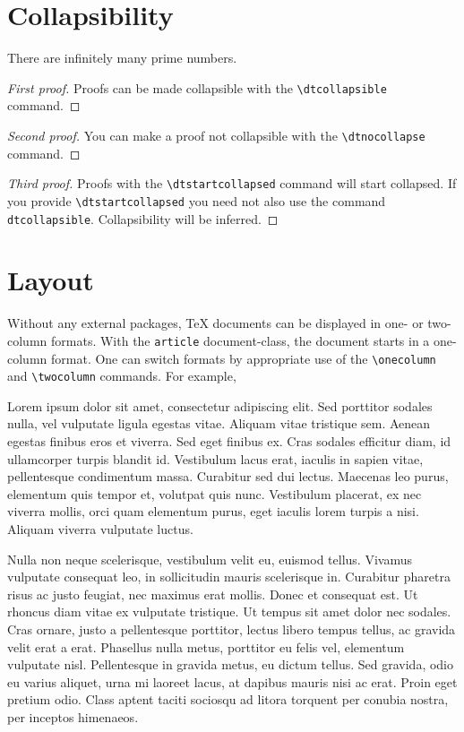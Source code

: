 \documentclass[11pt]{article}
\begin{document}
\section{Collapsibility}

\begin{theorem}
    There are infinitely many prime numbers.
\end{theorem}

\begin{proof}[First proof]\dtcollapsible
    Proofs can be made collapsible with the \verb|\dtcollapsible| command.
\end{proof}

\begin{proof}[Second proof]\dtnocollapse
    You can make a proof not collapsible with the \verb|\dtnocollapse| command.
\end{proof}

\begin{proof}[Third proof]\dtstartcollapsed
    Proofs with the \verb|\dtstartcollapsed| command will start collapsed.
    If you provide \verb|\dtstartcollapsed| you need not also use the command \verb|dtcollapsible|.
    Collapsibility will be inferred.
\end{proof}

\section{Layout}
Without any external packages, \TeX{} documents can be displayed in one- or two-column formats.
With the \verb|article| document-class, the document starts in a one-column format.
One can switch formats by appropriate use of the \verb|\onecolumn| and \verb|\twocolumn| commands.
For example,

\twocolumn
Lorem ipsum dolor sit amet, consectetur adipiscing elit. Sed porttitor sodales nulla, vel vulputate ligula egestas vitae. Aliquam vitae tristique sem. Aenean egestas finibus eros et viverra. Sed eget finibus ex. Cras sodales efficitur diam, id ullamcorper turpis blandit id. Vestibulum lacus erat, iaculis in sapien vitae, pellentesque condimentum massa. Curabitur sed dui lectus. Maecenas leo purus, elementum quis tempor et, volutpat quis nunc. Vestibulum placerat, ex nec viverra mollis, orci quam elementum purus, eget iaculis lorem turpis a nisi. Aliquam viverra vulputate luctus.

\twocolumn
Nulla non neque scelerisque, vestibulum velit eu, euismod tellus. Vivamus vulputate consequat leo, in sollicitudin mauris scelerisque in. Curabitur pharetra risus ac justo feugiat, nec maximus erat mollis. Donec et consequat est. Ut rhoncus diam vitae ex vulputate tristique. Ut tempus sit amet dolor nec sodales. Cras ornare, justo a pellentesque porttitor, lectus libero tempus tellus, ac gravida velit erat a erat. Phasellus nulla metus, porttitor eu felis vel, elementum vulputate nisl. Pellentesque in gravida metus, eu dictum tellus. Sed gravida, odio eu varius aliquet, urna mi laoreet lacus, at dapibus mauris nisi ac erat. Proin eget pretium odio. Class aptent taciti sociosqu ad litora torquent per conubia nostra, per inceptos himenaeos.
\end{document}
